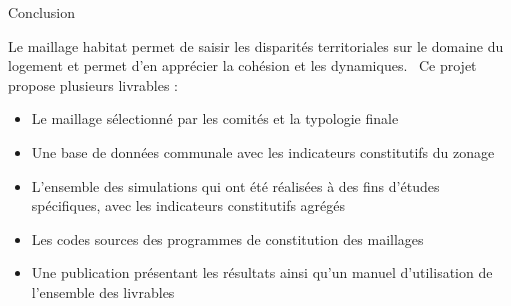 \documentclass[11pt]{beamer}
\begin{document}
\begin{frame}{Conclusion}

Le maillage habitat permet de saisir les disparités territoriales sur le domaine du logement et permet d'en apprécier la cohésion et les dynamiques. \
Ce projet propose plusieurs livrables :
\begin{itemize}
\item Le maillage sélectionné par les comités et la typologie finale
\item Une base de données communale avec les indicateurs constitutifs du zonage
\item L'ensemble des simulations qui ont été réalisées à des fins d'études spécifiques, avec les indicateurs constitutifs agrégés
\item Les codes sources des programmes de constitution des maillages
\item Une publication présentant les résultats ainsi qu'un manuel d'utilisation de l'ensemble des livrables
\end{itemize}
\end{frame}
\end{document}
